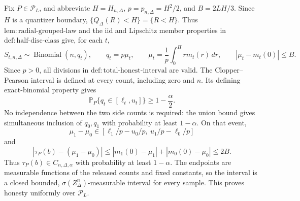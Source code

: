 Fix \(P\in\mathcal P_L\), and abbreviate \(H=H_{n,\Delta}\), \(p=p_{n,\Delta}=H^2/2\), and \(B=2LH/3\).  Since \(H\) is a quantizer boundary, \(\{Q_\Delta(R)<H\}=\{R<H\}\).  Thus \(\mathrm{lem:radial\text{-}grouped\text{-}law}\) and the iid and Lipschitz member properties in \(\mathrm{def:half\text{-}disc\text{-}class}\) give, for each \(t\),
\[
 S_{t,n,\Delta}\sim\operatorname{Binomial}(n,q_t),
 \qquad
 q_t=p\mu_t,
 \qquad
 \mu_t=\frac1p\int_0^H r m_t(r)\,dr,
 \qquad
 |\mu_t-m_t(0)|\le B.
\]
Since \(p>0\), all divisions in \(\mathrm{def:total\text{-}honest\text{-}interval}\) are valid.  The Clopper--Pearson interval is defined at every count, including zero and \(n\).  Its defining exact-binomial property gives
\[
 \mathbb P_P\{q_t\in[\ell_t,u_t]\}\ge1-\frac\alpha2.
\]
No independence between the two side counts is required: the union bound gives simultaneous inclusion of \(q_0,q_1\) with probability at least \(1-\alpha\).  On that event,
\[
 \mu_1-\mu_0\in
 [\ell_1/p-u_0/p,\ u_1/p-\ell_0/p]
\]
and
\[
 |\tau_P(b)-(\mu_1-\mu_0)|
 \le |m_1(0)-\mu_1|+|m_0(0)-\mu_0|
 \le2B.
\]
Thus \(\tau_P(b)\in C_{n,\Delta,\alpha}\) with probability at least \(1-\alpha\).  The endpoints are measurable functions of the released counts and fixed constants, so the interval is a closed bounded, \(\sigma(Z_\Delta^n)\)-measurable interval for every sample.  This proves honesty uniformly over \(\mathcal P_L\).

